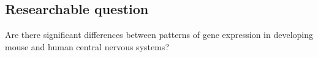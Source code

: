 \subsection{Researchable question}
Are there significant differences between patterns of gene expression in developing mouse and human central nervous systems?